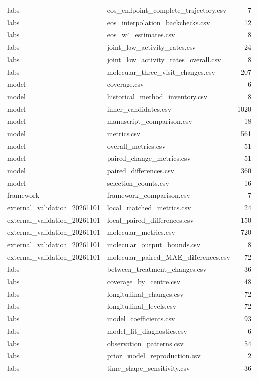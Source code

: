 \begin{longtable}{p{20mm}p{115mm}r}
labs & eos\_endpoint\_complete\_trajectory.csv & 7 \\
labs & eos\_interpolation\_backchecks.csv & 12 \\
labs & eos\_w4\_estimates.csv & 8 \\
labs & joint\_low\_activity\_rates.csv & 24 \\
labs & joint\_low\_activity\_rates\_overall.csv & 8 \\
labs & molecular\_three\_visit\_changes.csv & 207 \\
model & coverage.csv & 6 \\
model & historical\_method\_inventory.csv & 8 \\
model & inner\_candidates.csv & 1020 \\
model & manuscript\_comparison.csv & 18 \\
model & metrics.csv & 561 \\
model & overall\_metrics.csv & 51 \\
model & paired\_change\_metrics.csv & 51 \\
model & paired\_differences.csv & 360 \\
model & selection\_counts.csv & 16 \\
framework & framework\_comparison.csv & 7 \\
external\_validation\_20261101 & local\_matched\_metrics.csv & 24 \\
external\_validation\_20261101 & local\_paired\_differences.csv & 150 \\
external\_validation\_20261101 & molecular\_metrics.csv & 720 \\
external\_validation\_20261101 & molecular\_output\_bounds.csv & 8 \\
external\_validation\_20261101 & molecular\_paired\_MAE\_differences.csv & 72 \\
labs & between\_treatment\_changes.csv & 36 \\
labs & coverage\_by\_centre.csv & 48 \\
labs & longitudinal\_changes.csv & 72 \\
labs & longitudinal\_levels.csv & 72 \\
labs & model\_coefficients.csv & 93 \\
labs & model\_fit\_diagnostics.csv & 6 \\
labs & observation\_patterns.csv & 54 \\
labs & prior\_model\_reproduction.csv & 2 \\
labs & time\_shape\_sensitivity.csv & 36 \\

\end{longtable}
